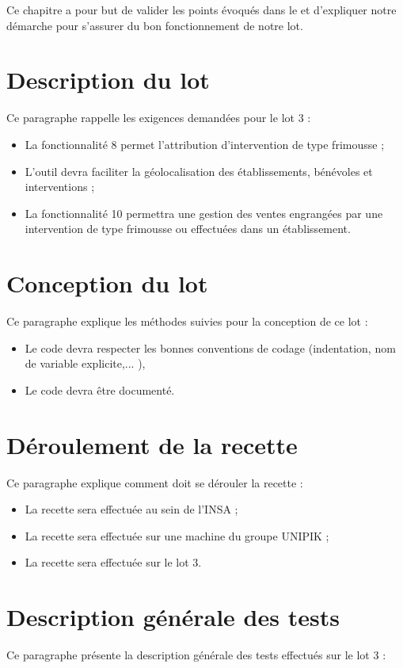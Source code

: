 
	Ce chapitre a pour but de valider les points évoqués dans le \DSE{} et d'expliquer notre démarche pour s'assurer du bon fonctionnement de notre lot.
	
\section{Description du lot}
	Ce paragraphe rappelle les exigences demandées pour le lot 3 :
	\begin{itemize}
		\item La fonctionnalité 8 permet l’attribution d’intervention de type frimousse ;
		\item L’outil devra faciliter la géolocalisation des établissements, bénévoles et interventions ;
		\item La fonctionnalité 10 permettra une gestion des ventes engrangées par une intervention de type frimousse ou effectuées dans un établissement.
	\end{itemize}
	
\section{Conception du lot}
	Ce paragraphe explique les méthodes suivies pour la conception de ce lot :
	\begin{itemize}
		\item Le code devra respecter les bonnes conventions de codage (indentation, nom de variable explicite,... ),
		\item Le code devra être documenté.
	\end{itemize}
	
\section{Déroulement de la recette}
	Ce paragraphe explique comment doit se dérouler la recette : 
	\begin{itemize}
		\item La recette sera effectuée au sein de l'INSA ;
		\item La recette sera effectuée sur une machine du groupe UNIPIK ;
		\item La recette sera effectuée sur le lot 3.
	\end{itemize}

\section{Description générale des tests}
	Ce paragraphe présente la description générale des tests effectués sur le lot 3 :	\\
	
